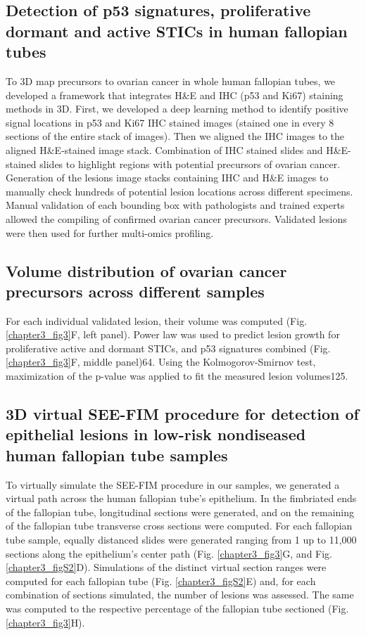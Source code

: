 \begin{refsection}
    \subsection{Detection of p53 signatures, proliferative dormant and active STICs in human fallopian tubes}
    To 3D map precursors to ovarian cancer in whole human fallopian tubes, we developed a framework that integrates H\&E and IHC (p53 and Ki67) staining methods in 3D. First, we developed a deep learning method to identify positive signal locations in p53 and Ki67 IHC stained images (stained one in every 8 sections of the entire stack of images). Then we aligned the IHC images to the aligned H\&E-stained image stack. Combination of IHC stained slides and H\&E-stained slides to highlight regions with potential precursors of ovarian cancer. Generation of the lesions image stacks containing IHC and H\&E images to manually check hundreds of potential lesion locations across different specimens. Manual validation of each bounding box with pathologists and trained experts allowed the compiling of confirmed ovarian cancer precursors. Validated lesions were then used for further multi-omics profiling.
    
    \subsection{Volume distribution of ovarian cancer precursors across different samples}
    For each individual validated lesion, their volume was computed (Fig.\ref{chapter3_fig3}F, left panel). Power law was used to predict lesion growth for proliferative active and  dormant STICs, and p53 signatures combined (Fig. \ref{chapter3_fig3}F, middle panel)\cite{Power}64. Using the Kolmogorov-Smirnov test, maximization of the p-value was applied to fit the measured lesion volumes\cite{Massey1951Kolmogorov}125.
    
    \subsection{3D virtual SEE-FIM procedure for detection of epithelial lesions in low-risk nondiseased human fallopian tube samples}
    To virtually simulate the SEE-FIM procedure in our samples, we generated a virtual path across the human fallopian tube’s epithelium. In the fimbriated ends of the fallopian tube, longitudinal sections were generated, and on the remaining of the fallopian tube transverse cross sections were computed. For each fallopian tube sample, equally distanced slides were generated ranging from 1 up to 11,000 sections along the epithelium’s center path (Fig. \ref{chapter3_fig3}G, and Fig. \ref{chapter3_figS2}D). Simulations of the distinct virtual section ranges were computed for each fallopian tube (Fig. \ref{chapter3_figS2}E) and, for each combination of sections simulated, the number of lesions was assessed. The same was computed to the respective percentage of the fallopian tube sectioned (Fig. \ref{chapter3_fig3}H).
    

\end{refsection}
